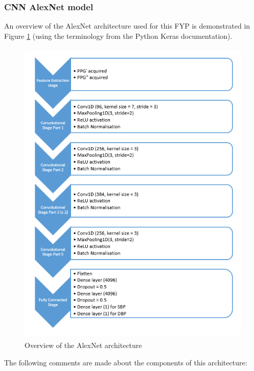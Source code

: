 \subsubsection{CNN AlexNet model}
An overview of the AlexNet architecture \cite{alexNet} used for this FYP is demonstrated in Figure \ref{alexnetArch} (using the terminology from the Python Keras documentation). 
\begin{figure}[H]
    \centering
    \includegraphics[width=15cm,height=15cm,keepaspectratio]{Implementation/alexnetArch.png}
    \caption{Overview of the AlexNet architecture}
    \label{alexnetArch}
\end{figure}\noindent The following comments are made about the components of this architecture:
